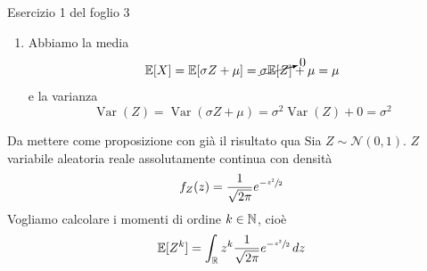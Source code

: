 \documentclass[a4paper]{article}
\begin{document}
\begin{snippetsolution}{Esercizio 1 del foglio 3}
\begin{enumerate}
            Abbiamo quindi ottenuto \[
                F_X(x) = \integral[-\infty][x][
                    \frac{1}{\sigma \sqrt{2\pi}} e^{-\frac{(t-\mu)^2}{2\sigma^2}}
                    \cdot
                ][x]
            \]
            Quindi \(X\) verifica la definizione
            di assoluta continuità
            con densità \[
                f_X(x) = \frac{1}{\sigma\sqrt{2\pi}} e^{- \frac{(x - \mu)^2}{2\sigma^2}}
            \]
        \item Abbiamo la media \[
                \mathbb E[X] = \mathbb E[\sigma Z + \mu]
                = \cancelto{0}{\sigma \mathbb E[Z]} + \mu = \mu
            \]
            e la varianza \[
                \operatorname{Var}(Z) = \operatorname{Var}(\sigma Z + \mu)
                = \sigma^2 \operatorname{Var}(Z) + 0 = \sigma^2
            \]
    \end{enumerate}
\end{snippetsolution}

\begin{snippetexercise}{Da mettere come proposizione con già il risultato qua}
    Sia \(Z \sim \mathcal N(0,1)\). \(Z\) variabile aleatoria reale assolutamente continua
    con densità \[
        f_Z(z) = \frac{1}{\sqrt{2\pi}} e^{-\sfrac{z^2}{2}}
    \]
    Vogliamo calcolare i momenti di ordine \(k \in \mathbb{N}\), cioè
    \[
        \mathbb E[Z^k] = \int_{\mathbb{R}} z^k \frac{1}{\sqrt{2\pi}} e^{-\sfrac{z^2}{2}}\,dz
    \]
\end{snippetexercise}
\end{document}
